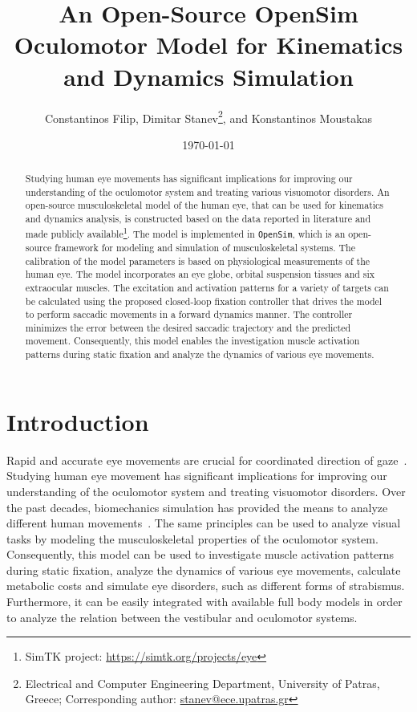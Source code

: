 \documentclass[11pt,a4paper,draft=false]{report}
\title{An Open-Source OpenSim Oculomotor Model for Kinematics and Dynamics
  Simulation}
\author{Constantinos Filip, Dimitar Stanev\footnote{Electrical and Computer
    Engineering Department, University of Patras, Greece; Corresponding
    author: \url{stanev@ece.upatras.gr}}, and Konstantinos Moustakas}
\date{\today}
\begin{document}

\maketitle

\begin{abstract}
  Studying human eye movements has significant implications for improving our
  understanding of the oculomotor system and treating various visuomotor
  disorders. An open-source musculoskeletal model of the human eye, that can be
  used for kinematics and dynamics analysis, is constructed based on the data
  reported in literature and made publicly available\footnote{SimTK project:
    \url{https://simtk.org/projects/eye}}. The model is implemented in
  \texttt{OpenSim}, which is an open-source framework for modeling and
  simulation of musculoskeletal systems. The calibration of the model parameters
  is based on physiological measurements of the human eye. The model
  incorporates an eye globe, orbital suspension tissues and six extraocular
  muscles. The excitation and activation patterns for a variety of targets can
  be calculated using the proposed closed-loop fixation controller that drives
  the model to perform saccadic movements in a forward dynamics manner. The
  controller minimizes the error between the desired saccadic trajectory and the
  predicted movement. Consequently, this model enables the investigation muscle
  activation patterns during static fixation and analyze the dynamics of various
  eye movements.
\end{abstract}

\section*{Introduction}\label{sec:introduction}

Rapid and accurate eye movements are crucial for coordinated direction of
gaze~\cite{Lee2006}. Studying human eye movement has significant implications
for improving our understanding of the oculomotor system and treating visuomotor
disorders. Over the past decades, biomechanics simulation has provided the means
to analyze different human movements~\cite{Delp2007}. The same principles can be
used to analyze visual tasks by modeling the musculoskeletal properties of the
oculomotor system. Consequently, this model can be used to investigate muscle
activation patterns during static fixation, analyze the dynamics of various eye
movements, calculate metabolic costs and simulate eye disorders, such as
different forms of strabismus. Furthermore, it can be easily integrated with
available full body models in order to analyze the relation between the
vestibular and oculomotor systems.
\end{document}

